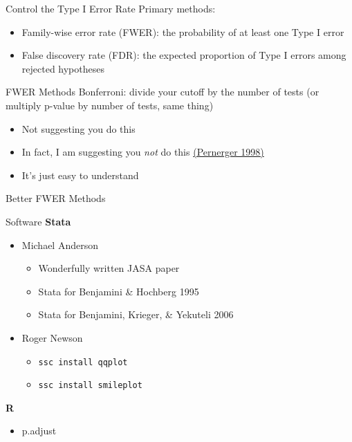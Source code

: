 \documentclass{beamer}
\begin{document}
\begin{frame}{Control the Type I Error Rate}
Primary methods:
\begin{itemize}
\item Family-wise error rate (FWER): the probability of at least one Type I error
\item False discovery rate (FDR): the expected proportion of Type I errors among rejected hypotheses
\end{itemize}
\end{frame}

\begin{frame}{FWER Methods}
Bonferroni: divide your cutoff by the number of tests (or multiply p-value by number of tests, same thing)
\begin{itemize}
\item Not suggesting you do this
\item In fact, I am suggesting you \textit{not} do this 
\href{https://www.ncbi.nlm.nih.gov/pmc/articles/PMC1112991/}{(Pernerger 1998)}
\item It's just easy to understand
\end{itemize}
\end{frame}

\begin{frame}{Better FWER Methods}
\end{frame}

\begin{frame}{Software}
\textbf{Stata}
\begin{itemize}
\item Michael Anderson
\begin{itemize}
\item Wonderfully written JASA paper \href{https://are.berkeley.edu/~mlanderson/pdf/Anderson\%202008a.pdf}{}
\item Stata for Benjamini \& Hochberg 1995 \href{http://are.berkeley.edu/~mlanderson/downloads/fdr_qvalues.do.zip}{}
\item Stata for Benjamini, Krieger, \& Yekuteli 2006 \href{http://are.berkeley.edu/~mlanderson/downloads/fdr\_sharpened\_qvalues.do.zip}{}
\end{itemize}
\item Roger Newson
\begin{itemize}
\item \texttt{ssc install qqplot} \href{http://www.stata-journal.com/sjpdf.html?articlenum=st0209}{}
\item \texttt{ssc install smileplot} \href{http://www.stata-journal.com/sjpdf.html?articlenum=st0035}{}
\end{itemize}
\end{itemize}
\textbf{R}
\begin{itemize}
\item p.adjust \href{https://www.rdocumentation.org/packages/stats/versions/3.4.3/topics/p.adjust}{}
\end{itemize}
\end{frame}
\end{document}
